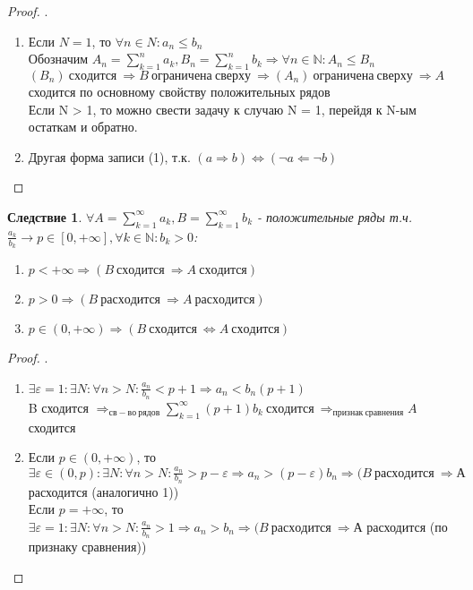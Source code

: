 \documentclass[12pt, a4]{article}
\newtheorem*{corollary}{Следствие}
\renewcommand{\implies}{\Rightarrow}
\newcommand{\bimplies}{\Leftarrow}
\renewcommand{\iff}{\Leftrightarrow}
\renewcommand{\epsilon}{\varepsilon}
\newcommand{\N}{\mathbb{N}}
\begin{document}
\begin{proof}.\\
\begin{enumerate}
    \item Если $N = 1$, то $\forall n \in N: a_n \leq b_n$\\
        Обозначим $A_n = \sum_{k=1}^n a_k, B_n = \sum_{k=1}^n b_k \implies \forall n \in \N: A_n \leq B_n$\\
        $(B_n)\ сходится\ \implies B\ ограничена\ сверху\ \implies (A_n)\ ограничена\ сверху\ \implies A$ сходится по основному свойству положительных рядов\\
        Если N > 1, то можно свести задачу к случаю N = 1, перейдя к N-ым остаткам и обратно.
    \item Другая форма записи (1), т.к. $(a \implies b) \iff (\lnot a \bimplies \lnot b)$
\end{enumerate}
\end{proof}

\begin{corollary}
$\forall A = \sum_{k=1}^\infty a_k, B = \sum_{k=1}^\infty b_k$ - положительные ряды т.ч. $\frac{a_k}{b_k}\to p \in [0, +\infty], \forall k \in \N: b_k > 0$:
\begin{enumerate}
    \item $p < +\infty \implies (B\ сходится\ \implies A\ сходится)$
    \item $p > 0 \implies (B\ расходится\ \implies A\ расходится)$
    \item $p \in (0,+\infty) \implies (B\ сходится\ \iff A\ сходится)$
\end{enumerate}
\end{corollary}

\begin{proof}.\\
\begin{enumerate}
    \item $\exists \epsilon = 1: \exists N: \forall n > N: \frac{a_n}{b_n} < p + 1 \implies a_n < b_n (p+1)$\\
    B сходится $\implies_{св-во\ рядов} \sum_{k=1}^\infty(p+1)b_k\ сходится\ \implies_{признак\ сравнения} A$ сходится
    \item Если $p \in (0, +\infty)$, то $\exists \epsilon \in (0, p): \exists N: \forall n > N: \frac{a_n}{b_n} > p - \epsilon \implies a_n > (p - \epsilon)b_n \implies (B\ расходится\ \implies А$ расходится (аналогично 1))\\
    Если $p = +\infty$, то $\exists \epsilon = 1: \exists N: \forall n > N: \frac{a_n}{b_n} > 1 \implies a_n > b_n \implies (B\ расходится\ \implies А$ расходится (по признаку сравнения))
\end{enumerate}
\end{proof}
\end{document}
